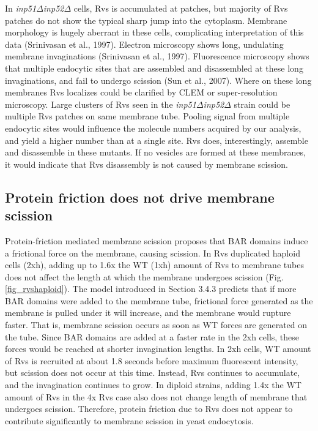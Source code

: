 \vspace{5mm}
In \textit{inp51$\Delta$}\textit{inp52$\Delta$} cells, Rvs is accumulated at patches, but majority of Rvs patches do not show the typical sharp jump into the cytoplasm. Membrane morphology is hugely aberrant in these cells, complicating interpretation of this data (Srinivasan et al., 1997). Electron microscopy shows long, undulating membrane invaginations (Srinivasan et al., 1997). Fluorescence microscopy shows that multiple endocytic sites that are assembled and disassembled at these long invaginations, and fail to undergo scission (Sun et al., 2007). Where on these long membranes Rvs localizes could be clarified by CLEM or super-resolution microscopy. Large clusters of Rvs seen in the \textit{inp51$\Delta$}\textit{inp52$\Delta$} strain could be multiple Rvs patches on same membrane tube. Pooling signal from multiple endocytic sites would influence the molecule numbers acquired by our analysis, and yield a higher number than at a single site. Rvs does, interestingly, assemble and disassemble in these mutants. If no vesicles are formed at these membranes, it would indicate that Rvs disassembly is not caused by membrane scission.


\subsection{Protein friction does not drive membrane scission}
Protein-friction mediated membrane scission proposes that BAR domains induce a frictional force on the membrane, causing scission. In Rvs duplicated haploid cells (2xh), adding up to 1.6x the WT (1xh) amount of Rvs to membrane tubes does not affect the length at which the membrane undergoes scission (Fig.\ref{fig_rvshaploid}). The model introduced in Section 3.4.3 predicts that if more BAR domains were added to the membrane tube, frictional force generated as the membrane is pulled under it will increase, and the membrane would rupture faster. That is, membrane scission occurs as soon as WT forces are generated on the tube. Since BAR domains are added at a faster rate in the 2xh cells, these forces would be reached at shorter invagination lengths. In 2xh cells, WT amount of Rvs is recruited at about 1.8 seconds before maximum fluorescent intensity, but scission does not occur at this time. Instead, Rvs continues to accumulate, and the invagination continues to grow. In diploid strains, adding 1.4x the WT amount of Rvs in the 4x Rvs case also does not change length of membrane that undergoes scission. Therefore, protein friction due to Rvs does not appear to contribute significantly to membrane scission in yeast endocytosis. 


